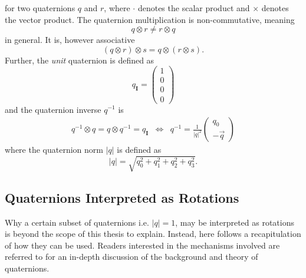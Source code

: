 \documentclass{LTHthesis}
\begin{document}
%
for two quaternions $q$ and $r$, where $\cdot$ denotes the scalar product and $\times$ denotes the vector product. The quaternion multiplication is non-commutative, meaning
%
\begin{equation}
{q}\otimes {r} \neq {r} \otimes {q}
\end{equation}
%
in general. It is, however associative
%
\begin{equation}
({q}\otimes{r})\otimes{s} = {q}\otimes({r}\otimes{s}).
\label{equation:quat_asso}
\end{equation} 
%
Further, the \emph{unit} quaternion is defined as
%
\begin{equation}
{q_{\mathbf{I}}}=\left(\begin{array}{c}1\\ 0 \\ 0 \\ 0\end{array}\right)
\end{equation}
%
and the quaternion inverse $q^{-1}$ is
%
\begin{eqnarray}
q^{-1}\otimes q = q\otimes q^{-1} = q_{\mathbf{I}} &\Leftrightarrow& q^{-1} = \frac{1}{|q|^2}\left(\begin{array}{c}q_0\\ -\vec{q}\end{array}\right)
\end{eqnarray}
%
where the quaternion norm $|q|$ is defined as
%
\begin{equation}
|q| = \sqrt{q_0^2+q_1^2+q_2^2+q_3^2 }.
\end{equation} 
%
\subsection{Quaternions Interpreted as Rotations}
%
Why a certain subset of quaternions i.e. $|q|=1$, may be interpreted as rotations is beyond the scope of this thesis to explain. Instead, here follows a recapitulation of how they can be used. Readers interested in the mechanisms involved are referred to \cite{kuip98} for an in-depth discussion of the background and theory of quaternions. 
\end{document}
